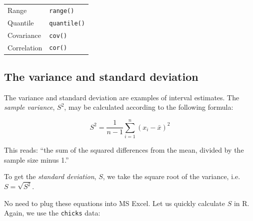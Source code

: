 \documentclass[english,10pt,a4paper,oneside]{book}
\newenvironment{Shaded}{\begin{snugshade}}{\end{snugshade}}
\newcommand{\KeywordTok}[1]{\textcolor[rgb]{0.13,0.29,0.53}{\textbf{#1}}}
\newcommand{\DataTypeTok}[1]{\textcolor[rgb]{0.13,0.29,0.53}{#1}}
\newcommand{\StringTok}[1]{\textcolor[rgb]{0.31,0.60,0.02}{#1}}
\newcommand{\OperatorTok}[1]{\textcolor[rgb]{0.81,0.36,0.00}{\textbf{#1}}}
\newcommand{\NormalTok}[1]{#1}
\theoremstyle{definition}
\theoremstyle{definition}
\theoremstyle{definition}
\theoremstyle{remark}
\begin{document}
\begin{longtable}[]{@{}ll@{}}
\begin{minipage}[t]{0.29\columnwidth}
Range\strut
\end{minipage} & \begin{minipage}[t]{0.29\columnwidth}\raggedright\strut
\texttt{range()}\strut
\end{minipage}\tabularnewline
\begin{minipage}[t]{0.29\columnwidth}\raggedright\strut
Quantile\strut
\end{minipage} & \begin{minipage}[t]{0.29\columnwidth}\raggedright\strut
\texttt{quantile()}\strut
\end{minipage}\tabularnewline
\begin{minipage}[t]{0.29\columnwidth}\raggedright\strut
Covariance\strut
\end{minipage} & \begin{minipage}[t]{0.29\columnwidth}\raggedright\strut
\texttt{cov()}\strut
\end{minipage}\tabularnewline
\begin{minipage}[t]{0.29\columnwidth}\raggedright\strut
Correlation\strut
\end{minipage} & \begin{minipage}[t]{0.29\columnwidth}\raggedright\strut
\texttt{cor()}\strut
\end{minipage}\tabularnewline
\bottomrule
\end{longtable}

\subsection{The variance and standard
deviation}\label{the-variance-and-standard-deviation}

The variance and standard deviation are examples of interval estimates.
The \emph{sample variance}, \(S^{2}\), may be calculated according to
the following formula:

\[S^{2} = \frac{1}{n-1}\sum_{i=1}^{n}(x_{i}-\bar{x})^{2}\]

This reads: \enquote{the sum of the squared differences from the mean,
divided by the sample size minus 1.}

To get the \emph{standard deviation}, \(S\), we take the square root of
the variance, i.e. \(S = \sqrt{S^{2}}\).

No need to plug these equations into MS Excel. Let us quickly calculate
\(S\) in R. Again, we use the \texttt{chicks} data:

\begin{Shaded}
\end{Shaded}
\end{document}
